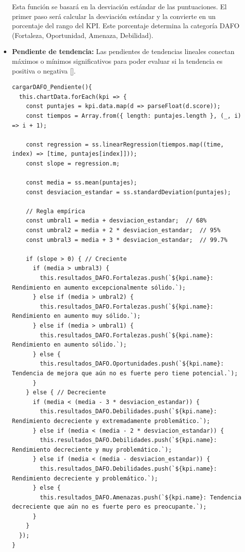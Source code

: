 \begin{itemize}
Esta función se basará en la desviación estándar de las puntuaciones. El primer paso será calcular la desviación estándar y la convierte en un porcentaje del rango del KPI. Este porcentaje determina la categoría DAFO (Fortaleza, Oportunidad, Amenaza, Debilidad).


	\item \textbf{Pendiente de tendencia:} Las pendientes de tendencias lineales conectan máximos o mínimos significativos para poder evaluar si la tendencia es positiva o negativa [\cite{def_tend}].

\begin{lstlisting}[style=Javascript-color, caption={Función DAFO - Tendencia},label=Javascript-color_code_tend]
cargarDAFO_Pendiente(){
  this.chartData.forEach(kpi => {
    const puntajes = kpi.data.map(d => parseFloat(d.score));
    const tiempos = Array.from({ length: puntajes.length }, (_, i) => i + 1);

    const regression = ss.linearRegression(tiempos.map((time, index) => [time, puntajes[index]]));
    const slope = regression.m;

    const media = ss.mean(puntajes);
    const desviacion_estandar = ss.standardDeviation(puntajes);

    // Regla empírica
    const umbral1 = media + desviacion_estandar;  // 68%
    const umbral2 = media + 2 * desviacion_estandar;  // 95%
    const umbral3 = media + 3 * desviacion_estandar;  // 99.7%

    if (slope > 0) { // Creciente
      if (media > umbral3) {
        this.resultados_DAFO.Fortalezas.push(`${kpi.name}: Rendimiento en aumento excepcionalmente sólido.`);
      } else if (media > umbral2) {
        this.resultados_DAFO.Fortalezas.push(`${kpi.name}: Rendimiento en aumento muy sólido.`);
      } else if (media > umbral1) {
        this.resultados_DAFO.Fortalezas.push(`${kpi.name}: Rendimiento en aumento sólido.`);
      } else {
        this.resultados_DAFO.Oportunidades.push(`${kpi.name}: Tendencia de mejora que aún no es fuerte pero tiene potencial.`);
      }
    } else { // Decreciente
      if (media < (media - 3 * desviacion_estandar)) {
        this.resultados_DAFO.Debilidades.push(`${kpi.name}: Rendimiento decreciente y extremadamente problemático.`);
      } else if (media < (media - 2 * desviacion_estandar)) {
        this.resultados_DAFO.Debilidades.push(`${kpi.name}: Rendimiento decreciente y muy problemático.`);
      } else if (media < (media - desviacion_estandar)) {
        this.resultados_DAFO.Debilidades.push(`${kpi.name}: Rendimiento decreciente y problemático.`);
      } else {
        this.resultados_DAFO.Amenazas.push(`${kpi.name}: Tendencia decreciente que aún no es fuerte pero es preocupante.`);
      }
    }
  });
}
\end{lstlisting}


\end{itemize}
